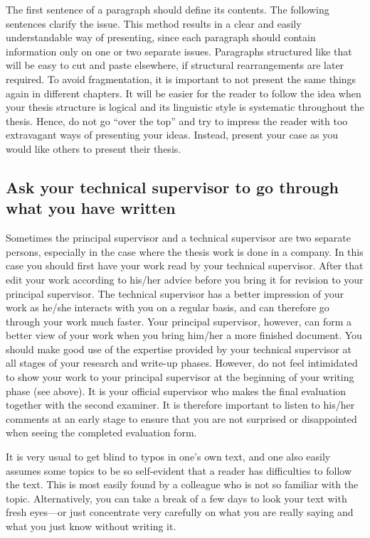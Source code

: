 The first sentence of a paragraph should define its contents. The following sentences clarify the issue. This method results in a clear and easily understandable way of presenting, since each paragraph should contain information only on one or two separate issues. Paragraphs structured like that will be easy to cut and paste elsewhere, if structural rearrangements are later required. To avoid fragmentation, it is important to not present the same things again in different chapters. It will be easier for the reader to follow the idea when your thesis structure is logical and its linguistic style is systematic throughout the thesis. Hence, do not go “over the top” and try to impress the reader with too extravagant ways of presenting your ideas. Instead, present your case as you would like others to present their thesis.

\subsection{Ask your technical supervisor to go through what you have written}

Sometimes the principal supervisor and a technical supervisor are two separate persons, especially in the case where the thesis work is done in a company. In this case you should first have your work read by your technical supervisor. After that edit your work according to his/her advice before you bring it for revision to your principal supervisor. The technical supervisor has a better impression of your work as he/she interacts with you on a regular basis, and can therefore go through your work much faster. Your principal supervisor, however, can form a better view of your work when you bring him/her a more finished document. You should make good use of the expertise provided by your technical supervisor at all stages of your research and write-up phases. However, do not feel intimidated to show your work to your principal supervisor at the beginning of your writing phase (see  above). It is your official supervisor who makes the final evaluation together with the second examiner. It is therefore important to listen to his/her comments at an early stage to ensure that you are not surprised or disappointed when seeing the completed evaluation form.

It is very usual to get blind to typos in one’s own text, and one also easily assumes some topics to be so self-evident that a reader has difficulties to follow the text. This is most easily found by a colleague who is not so familiar with the topic. Alternatively, you can take a break of a few days to look your text with fresh eyes---or just concentrate very carefully on what you are really saying and what you just know without writing it.

